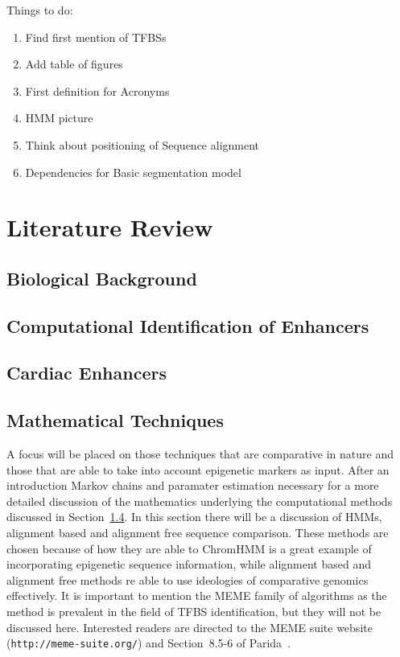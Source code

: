 \documentclass[12pt,a4paper]{article}
\begin{document}
    \tableofcontents
    Things to do:
    \begin{enumerate}
        \item Find first mention of TFBSs
        \item Add table of figures
        \item First definition for Acronyms
        \item HMM picture
        \item Think about positioning of Sequence alignment
        \item Dependencies for Basic segmentation model
    \end{enumerate}
    \section{Literature Review}
        \subsection{Biological Background}
        
        \subsection{Computational Identification of Enhancers}
        \label{sSec:computational}
         
        \subsection{Cardiac Enhancers}
        
        \subsection{Mathematical Techniques}
        \label{sSec:mathematical}
        A focus will be placed on those techniques that are comparative in nature and those that are able to take into account epigenetic markers as input. After an introduction Markov chains and paramater estimation necessary for a more detailed discussion of the mathematics underlying the computational methods discussed in Section~\ref{sSec:mathematical}. In this section there will be a discussion of HMMs, alignment based and alignment free sequence comparison. These methods are chosen because of how they are able to ChromHMM is a great example of incorporating epigenetic sequence information, while alignment based and alignment free methods re able to use ideologies of comparative genomics effectively. It is important to mention the MEME family of algorithms as the method is prevalent in the field of TFBS identification, but they will not be discussed here.%
        Interested readers are directed to the MEME suite website (\texttt{http://meme-suite.org/}) and Section~8.5-6 of Parida~\cite{parida2007pattern}. 
\end{document}
